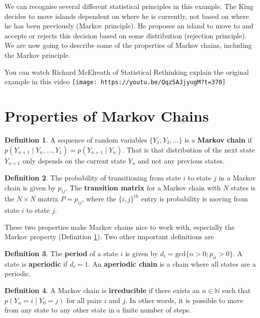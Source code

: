 \documentclass[
]{book}
\theoremstyle{definition}
\newtheorem{definition}{Definition}[chapter]
\theoremstyle{definition}
\theoremstyle{definition}
\theoremstyle{definition}
\theoremstyle{remark}
\begin{document}
We can recognise several different statistical principles in this example. The King decides to move islands dependent on where he is currently, not based on where he has been previously (Markov principle). He proposes an island to move to and accepts or rejects this decision based on some distribution (rejection principle). We are now going to describe some of the properties of Markov chains, including the Markov principle.

You can watch Richard McElreath of Statistical Rethinking explain the original example in this video \texttt{[image: https://youtu.be/Qqz5AJjyugM?t=370]}

\hypertarget{properties-of-markov-chains}{%
\section{Properties of Markov Chains}\label{properties-of-markov-chains}}

\begin{definition}
\protect\hypertarget{def:Markov}{}\label{def:Markov}A sequence of random variables \(\{Y_1, Y_2, \ldots\}\) is a \textbf{Markov chain} if \(p(Y_{n+1} \mid Y_{n}, \ldots, Y_1) = p(Y_{n+1} \mid Y_{n})\). That is that distribution of the next state \(Y_{n+1}\) only depends on the current state \(Y_n\) and not any previous states.
\end{definition}

\begin{definition}
The probability of transitioning from state \(i\) to state \(j\) in a Markov chain is given by \(p_{ij}\). The \textbf{transition matrix} for a Markov chain with \(N\) states is the \(N \times N\) matrix \(P = p_{ij}\), where the \(\{i, j\}^{th}\) entry is probability is moving from state \(i\) to state \(j\).
\end{definition}

These two properties make Markov chains nice to work with, especially the Markov property (Definition \ref{def:Markov}). Two other important definitions are

\begin{definition}
The \textbf{period }of a state \(i\) is given by \(d_i = \textrm{gcd}\{n > 0; p_{ii} > 0 \}\). A state is \textbf{aperiodic} if \(d_i = 1\). An \textbf{aperiodic chain} is a chain where all states are a periodic.
\end{definition}

\begin{definition}
A Markov chain is \textbf{irreducible} if there exists an \(n \in \mathbb{N}\) such that \(p(Y_n = i \mid Y_0 = j)\) for all pairs \(i\) and \(j\). In other words, it is possible to move from any state to any other state in a finite number of steps.
\end{definition}
\end{document}
